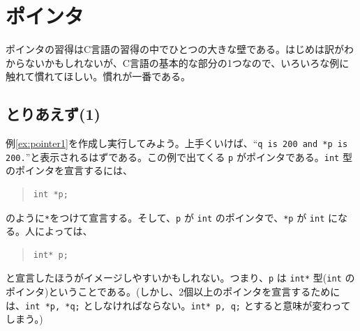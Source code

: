 \section{ポインタ}

ポインタの習得はC言語の習得の中でひとつの大きな壁である。はじめは訳がわからないかもしれないが、C言語の基本的な部分の1つなので、いろいろな例に触れて慣れてほしい。慣れが一番である。

\subsection{とりあえず(1)}

例\ref{ex:pointer1}を作成し実行してみよう。上手くいけば、``{\tt q is 200 and *p is 200.}''と表示されるはずである。この例で出てくる \verb|p| がポインタである。\verb|int| 型のポインタを宣言するには、
\begin{quote}
\begin{verbatim}
int *p;
\end{verbatim}
\end{quote}
のように\verb|*|をつけて宣言する。そして、\verb|p| が \verb|int| のポインタで、\verb|*p| が \verb|int| になる。人によっては、
\begin{quote}
\begin{verbatim}
int* p;
\end{verbatim}
\end{quote}
と宣言したほうがイメージしやすいかもしれない。つまり、\verb|p| は \verb|int*| 型(\verb|int| のポインタ)ということである。(しかし、2個以上のポインタを宣言するためには、\verb|int *p, *q;| としなければならない。\verb|int* p, q;| とすると意味が変わってしまう。)

